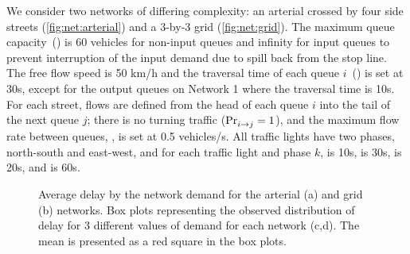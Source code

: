 We consider two networks of differing complexity: an arterial crossed by four
side streets (\cref{fig:net:arterial}) and a 3-by-3 grid (\cref{fig:net:grid}).
%
%
The maximum queue capacity~() is 60 vehicles for non-input queues and
infinity for input queues to prevent interruption of the input demand due to
spill back from the stop line. 
%
The free flow speed is 50 km/h and the traversal time of each queue $i$~() is set at 30s,
except for the output queues on Network 1 where the traversal
time is 10s.
%
For each street, flows are defined from the head of each queue $i$ into the tail
of the next queue $j$;
%
there is no turning traffic ($\mathrm{Pr}_{i\to j}^{\mathrm{}}=1$), and the maximum flow rate
between queues, , is set at 0.5 vehicles/s.
%
All traffic lights have two phases, north-south and east-west, and for each
traffic light \tl and phase $k$,  is 10s,  is 30s,
\CTMIN{\tl} is 20s, and \CTMAX{\tl} is 60s.

\begin{figure*}[t!] \centering
%
\caption{Average delay by the network demand for the arterial (a) and grid (b)
networks. Box plots representing the observed distribution of delay for 3
different values of demand for each network (c,d). The mean is presented as a
red square in the box plots.}
%
\label{fig:delayCurveAndBoxplot} \end{figure*}


